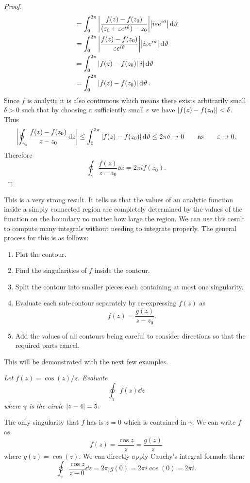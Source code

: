 \documentclass{article}
\begin{document}
\begin{proof}
\begin{align*}
            &= \int_0^{2\pi} \abs{\frac{f(z) - f(z_0)}{(z_0 + \varepsilon e^{i\vartheta}) - z_0}}\abs{i\varepsilon e^{i\vartheta}} \dd{\vartheta}\\
            &= \int_{0}^{2\pi} \abs{\frac{f(z) - f(z_0)}{\varepsilon e^{i\vartheta}}} \abs{i\varepsilon e^{i\vartheta}}\dd{\vartheta}\\
            &= \int_0^{2\pi} \abs{f(z) - f(z_0)}\abs{i}\dd{\vartheta}\\
            &= \int_0^{2\pi} \abs{f(z) - f(z_0)} \dd{\vartheta}.
        \end{align*}
        Since \(f\) is analytic it is also continuous which means there exists arbitrarily small \(\delta > 0\) such that by choosing a sufficiently small \(\varepsilon\) we have \(\abs{f(z) - f(z_0)} < \delta\).
        Thus
        \[\abs{\oint_{\gamma_\varepsilon} \frac{f(z) - f(z_0)}{z - z_0}\dd{z}} \le \int_0^{2\pi} \abs{f(z) - f(z_0)}\dd{\vartheta} \le 2\pi\delta \to 0\qquad\text{as}\qquad \varepsilon\to 0.\]
        Therefore
        \[\oint_{\gamma} \frac{f(z)}{z - z_0}\dd{z} = 2\pi i f(z_0).\]
    \end{proof}
    This is a very strong result.
    It tells us that the values of an analytic function inside a simply connected region are completely determined by the values of the function on the boundary no matter how large the region.
    We can use this result to compute many integrals without needing to integrate properly.
    The general process for this is as follows:
    \begin{enumerate}
        \item Plot the contour.
        \item Find the singularities of \(f\) inside the contour.
        \item Split the contour into smaller pieces each containing at most one singularity.
        \item Evaluate each sub-contour separately by re-expressing \(f(z)\) as
        \[f(z) = \frac{g(z)}{z - z_0}.\]
        \item Add the values of all contours being careful to consider directions so that the required parts cancel.
    \end{enumerate}
    This will be demonstrated with the next few examples.
    \begin{example}
        \textit{Let \(f(z) = \cos(z)/z\). Evaluate}
        \[\oint_{\gamma} f(z)\dd{z}\]
        \textit{where \(\gamma\) is the circle \(\abs{z - 4} = 5.\)}
        
        The only singularity that \(f\) has is \(z = 0\) which is contained in \(\gamma\).
        We can write \(f\) as
        \[f(z) = \frac{\cos z}{z} = \frac{g(z)}{z}\]
        where \(g(z) = \cos(z)\).
        We can directly apply Cauchy's integral formula then:
        \[\oint_{\gamma} \frac{\cos z}{z - 0} \dd{z} = 2\pi_i g(0) = 2\pi i\cos(0) = 2\pi i.\]
    \end{example}
\end{document}
